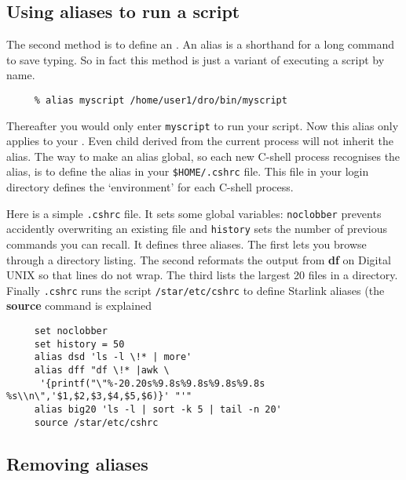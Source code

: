 \subsection{Using aliases to run a script
\label{sc4_se_aliases}}

The second method is to define an .
An alias is a shorthand for a long command to save typing.
So in fact this method is just a variant of executing a script by name.

\small
\begin{verbatim}
     % alias myscript /home/user1/dro/bin/myscript
\end{verbatim}
\normalsize
Thereafter you would only enter {\tt myscript} to run your script. Now
this alias only applies to your . Even child 
derived from the current process will not inherit the alias.  The way
to make an alias global, so each new C-shell process recognises the
alias, is to define the alias in your {\tt \$HOME/.cshrc} file.  This
file in your login directory defines the `environment' for each
C-shell process.

Here is a simple {\tt{.cshrc}} file.  It sets some global variables:
{\tt noclobber} prevents accidently overwriting an existing file and
{\tt history} sets the number of previous commands you can recall.  It
defines three aliases.  The first lets you browse through a
directory listing.  The second reformats the output from {\bf df}
on Digital UNIX so that lines do not wrap.  The third lists the largest
20 files in a directory.  Finally {\tt .cshrc} runs the script
{\tt /star/etc/cshrc} to define Starlink aliases (the {\bf source}
command is explained 

\small
\begin{verbatim}
     set noclobber
     set history = 50
     alias dsd 'ls -l \!* | more'
     alias dff "df \!* |awk \
      '{printf("\"%-20.20s%9.8s%9.8s%9.8s%9.8s %s\\n\",'$1,$2,$3,$4,$5,$6)}' "'"
     alias big20 'ls -l | sort -k 5 | tail -n 20'
     source /star/etc/cshrc    
\end{verbatim}
\normalsize

\subsection{Removing aliases
\label{sc4_se_unalias}}

